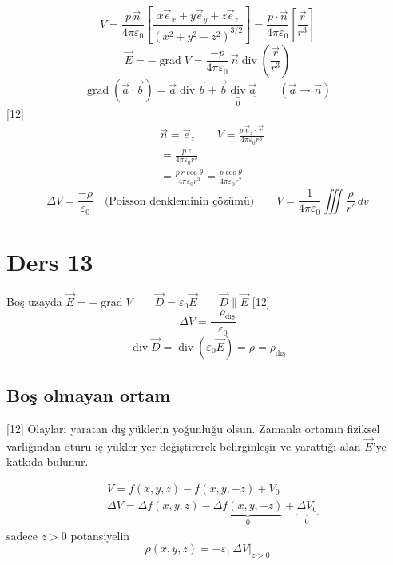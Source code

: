 \documentclass[11pt,a4paper]{article}
\begin{document}
\[ V=\frac{p\,\vec n}{4\pi\varepsilon_0}\left[\frac{x\vec e_x+y\vec e_y+z\vec e_z}{(x^2+y^2+z^2)^{3/2}}\right]=\frac{p\cdot\vec n}{4\pi\varepsilon_0}\left[\frac{\vec r}{r^3}\right] \]
\[ \vec E=-\operatorname{grad}V=\frac{-p}{4\pi\varepsilon_0}\,\vec n\operatorname{div}\!\left(\frac{\vec r}{r^3}\right) \]
\[ \operatorname{grad}(\vec a\cdot\vec b)=\vec a\operatorname{div}\vec b+\underbrace{\vec b\operatorname{div}\vec a}_{0}\qquad(\vec a\to\vec n) \]
[12]
\begin{align*}
&\vec n=\vec e_z\qquad V=\frac{p\,\vec e_z\cdot\vec r}{4\pi\varepsilon_0r^3}\\
&=\frac{p\,z}{4\pi\varepsilon_0r^3}\\
&=\frac{p\,r\cos\theta}{4\pi\varepsilon_0r^3}=\frac{p\cos\theta}{4\pi\varepsilon_0r^2}
\end{align*}
\[ \Delta V=\frac{-\rho}{\varepsilon_0}\quad\text{(Poisson denkleminin çözümü)}\qquad V=\frac{1}{4\pi\varepsilon_0}\iiint\frac{\rho}{r'}\,dv \]

\section{Ders 13}
Boş uzayda $\vec E=-\operatorname{grad}V\qquad \vec D=\varepsilon_0\vec E\qquad \vec D\parallel\vec E$
[12]
\[ \Delta V=\frac{-\rho_{\text{dış}}}{\varepsilon_0} \]
\[ \operatorname{div}\vec D=\operatorname{div}(\varepsilon_0\vec E)=\rho=\rho_{\text{dış}} \]
\subsection*{Boş olmayan ortam}
[12]
Olayları yaratan dış yüklerin yoğunluğu olsun. Zamanla ortamın fiziksel varlığından ötürü iç yükler yer değiştirerek belirginleşir ve yarattığı alan $\vec E$'ye katkıda bulunur.

\begin{align*}
&V=f(x,y,z)-f(x,y,-z)+V_0\\
&\Delta V=\Delta f(x,y,z)-\underbrace{\Delta f(x,y,-z)}_{0}+\underbrace{\Delta V_0}_{0}
\end{align*}
sadece $z>0$ potansiyelin 
\[ \rho(x,y,z)=-\varepsilon_1\,\Delta V\Big|_{z>0} \]
\end{document}
